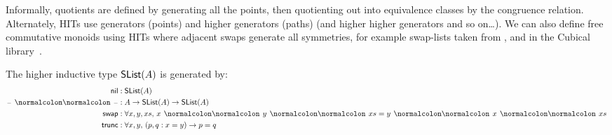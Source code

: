 Informally, quotients are defined by generating all the points, then quotienting out into equivalence classes by the
congruence relation.
%
Alternately, HITs use generators (points) and higher generators (paths) (and higher higher generators and so on\ldots).
%
We can also define free commutative monoids using HITs where adjacent swaps generate all symmetries,
for example swap-lists taken from \cite{choudhuryFreeCommutativeMonoids2023},
and in the Cubical library~\cite{theagdacommunityCubicalAgdaLibrary2025}.
%
\begin{definition}
    \label{def:slist}
    The higher inductive type $\operatorname{\mathsf{SList}}(A)$ is generated by:
    \begin{align*}
        \nil              & : \SList(A)                                                   \\
        \blank\cons\blank & : A \to \SList(A) \to \SList(A)                               \\
        \term{swap}       & : \forall x, y, xs,\, x \cons y \cons xs = y \cons x \cons xs \\
        \term{trunc}      & : \forall x, y,\, (p, q : x = y) \to p = q
    \end{align*}
\end{definition}
%
